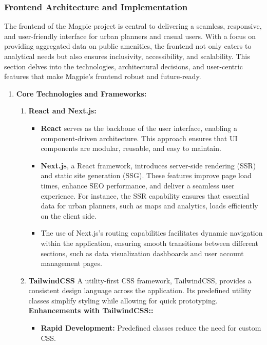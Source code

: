 \subsubsection{Frontend Architecture and Implementation}
The frontend of the Magpie project is central to delivering a seamless, responsive, and user-friendly interface for urban planners and casual users. With a focus on providing aggregated data on public amenities, the frontend not only caters to analytical needs but also ensures inclusivity, accessibility, and scalability. This section delves into the technologies, architectural decisions, and user-centric features that make Magpie’s frontend robust and future-ready.

\begin{enumerate}
    \item \textbf{Core Technologies and Frameworks:}
    \begin{enumerate}
        \item \textbf{React and Next.js:} \\
        \begin{itemize}
            \item \textbf{React} serves as the backbone of the user interface, enabling a component-driven architecture. This approach ensures that UI components are modular, reusable, and easy to maintain.
            \item \textbf{Next.js}, a React framework, introduces server-side rendering (SSR) and static site generation (SSG). These features improve page load times, enhance SEO performance, and deliver a seamless user experience. For instance, the SSR capability ensures that essential data for urban planners, such as maps and analytics, loads efficiently on the client side.
            \item The use of Next.js's routing capabilities facilitates dynamic navigation within the application, ensuring smooth transitions between different sections, such as data visualization dashboards and user account management pages.
        \end{itemize}
        \item \textbf{TailwindCSS}
        A utility-first CSS framework, TailwindCSS, provides a consistent design language across the application. Its predefined utility classes simplify styling while allowing for quick prototyping. 
        \textbf{Enhancements with TailwindCSS:: }
        \begin{itemize}
            \item \textbf{Rapid Development:}  Predefined classes reduce the need for custom CSS.

\end{itemize}
\end{enumerate}
\end{enumerate}
